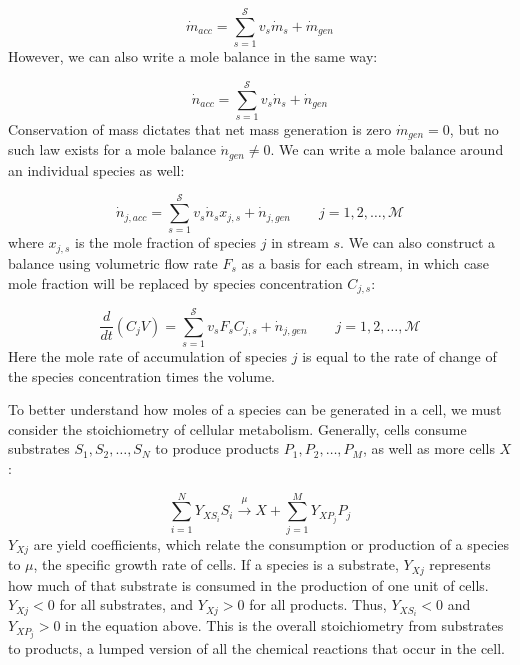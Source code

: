 \documentclass[12pt]{article}
\begin{document}
\begin{equation}
    \dot{m}_{acc}=\sum_{s=1}^{\mathcal{S}}v_s \dot{m}_s+\dot{m}_{gen}
\end{equation}
However, we can also write a mole balance in the same way:

\begin{equation}
    \dot{n}_{acc}=\sum_{s=1}^{\mathcal{S}}v_s \dot{n}_s+\dot{n}_{gen}
\end{equation}
Conservation of mass dictates that net mass generation is zero $\dot{m}_{gen}=0$, but no such law exists for a mole balance $\dot{n}_{gen}\neq 0$.
We can write a mole balance around an individual species as well:

\begin{equation}
    \dot{n}_{j,acc}=\sum_{s=1}^{\mathcal{S}}v_s \dot{n}_s x_{j,s}+\dot{n}_{j,gen}\qquad{j=1,2,\hdots,\mathcal{M}}
\end{equation}
where $x_{j,s}$ is the mole fraction of species $j$ in stream $s$.
We can also construct a balance using volumetric flow rate $F_s$ as a basis for each stream, in which case mole fraction will be replaced by species concentration $C_{j,s}$:

\begin{equation}
    \frac{d}{dt}\left(C_j V\right)=\sum_{s=1}^{\mathcal{S}}v_s F_s C_{j,s}+\dot{n}_{j,gen}\qquad{j=1,2,\hdots,\mathcal{M}}
\end{equation}
Here the mole rate of accumulation of species $j$ is equal to the rate of change of the species concentration times the volume.

To better understand how moles of a species can be generated in a cell, we must consider the stoichiometry of cellular metabolism. Generally, cells consume substrates $S_1,S_2,\hdots,S_N$ to produce products $P_1,P_2,\hdots,P_M$, as well as more cells $X$:

\begin{equation}
    \sum_{i=1}^{N}Y_{XS_i}S_i\overset{\mu}{\longrightarrow}X+\sum_{j=1}^{M}Y_{XP_j}P_j
\end{equation}
$Y_{Xj}$ are yield coefficients, which relate the consumption or production of a species to $\mu$, the specific growth rate of cells.
If a species is a substrate, $Y_{Xj}$ represents how much of that substrate is consumed in the production of one unit of cells.
$Y_{Xj}<0$ for all substrates, and $Y_{Xj}>0$ for all products.
Thus, $Y_{XS_i}<0$ and $Y_{XP_j}>0$ in the equation above.
This is the overall stoichiometry from substrates to products, a lumped version of all the chemical reactions that occur in the cell.
\end{document}
